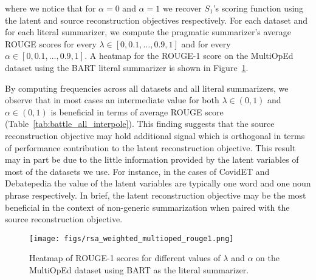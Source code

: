 \documentclass[11pt]{article}
\begin{document}
where we notice that for $\alpha = 0$ and $\alpha = 1$ we recover $S_1$'s scoring function using the latent and source reconstruction objectives respectively. For each dataset and for each literal summarizer, we compute the pragmatic summarizer's average ROUGE scores for every $\lambda \in [0, 0.1, \dots, 0.9, 1]$ and for every $\alpha \in [0, 0.1, \dots, 0.9, 1]$. A heatmap for the ROUGE-1 score on the MultiOpEd dataset using the BART literal summarizer is shown in Figure~\ref{fig:heatmap}.

By computing frequencies across all datasets and all literal summarizers, we observe that in most cases an intermediate value for both $\lambda \in (0,1)$ and $\alpha \in (0,1)$ is beneficial in terms of average ROUGE score (Table~\ref{tab:battle_all_interpole}). This finding suggests that the source reconstruction objective may hold additional signal which is orthogonal in terms of performance contribution to the latent reconstruction objective. This result may in part be due to the little information provided by the latent variables of most of the datasets we use. For instance, in the cases of CovidET and Debatepedia the value of the latent variables are typically one word and one noun phrase respectively.  In brief, the latent reconstruction objective may be the most beneficial in the context of non-generic summarization when paired with the source reconstruction objective.

\begin{figure}
    \centering
    \texttt{[image: figs/rsa\_weighted\_multioped\_rouge1.png]}
    \caption{Heatmap of ROUGE-1 scores for different values of $\lambda$ and $\alpha$ on the MultiOpEd dataset using BART as the literal summarizer.}
    \label{fig:heatmap}
\end{figure}

\begin{table}
\centering
\caption{Frequencies for when the maximum ROUGE score is achieved by the pragmatic summarizer using the latent-source reconstruction objective.}
\label{tab:battle_all_interpole}
\end{table}
\end{document}
